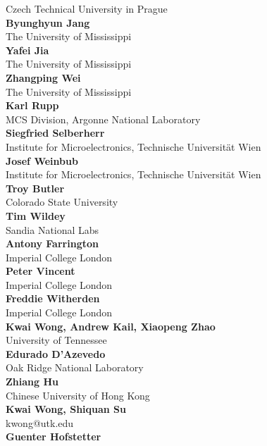 \documentclass[article,A4,11pt]{llncs}%
\begin{document}
    Czech Technical University in Prague\\
        \noindent
    {\bf Byunghyun Jang}\\
    The University of Mississippi\\
        \noindent
    {\bf Yafei Jia}\\
    The University of Mississippi\\
        \noindent
    {\bf Zhangping Wei}\\
    The University of Mississippi\\
        \noindent
    {\bf Karl Rupp}\\
    MCS Division, Argonne National Laboratory\\
        \noindent
    {\bf Siegfried Selberherr}\\
    Institute for Microelectronics, Technische Universität Wien\\
        \noindent
    {\bf Josef Weinbub}\\
    Institute for Microelectronics, Technische Universität Wien\\
        \noindent
    {\bf Troy Butler}\\
    Colorado State University\\
        \noindent
    {\bf Tim Wildey}\\
    Sandia National Labs\\
        \noindent
    {\bf Antony Farrington}\\
    Imperial College London\\
        \noindent
    {\bf Peter Vincent}\\
    Imperial College London\\
        \noindent
    {\bf Freddie Witherden}\\
    Imperial College London\\
        \noindent
    {\bf Kwai Wong, Andrew Kail, Xiaopeng Zhao}\\
    University of Tennessee\\
        \noindent
    {\bf Edurado D'Azevedo}\\
    Oak Ridge National Laboratory\\
        \noindent
    {\bf Zhiang Hu}\\
    Chinese University of Hong Kong\\
        \noindent
    {\bf Kwai Wong, Shiquan Su}\\
    kwong@utk.edu\\
        \noindent
    {\bf Guenter Hofstetter}\\
\end{document}
